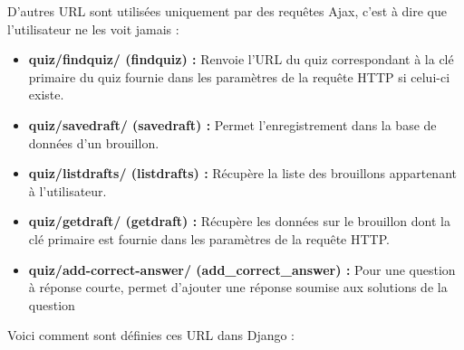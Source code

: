 \documentclass[a4,10pt,french]{sphinxmanual}
\begin{document}
D'autres URL sont utilisées uniquement par des requêtes Ajax, c'est à dire que l'utilisateur ne les voit jamais :
\begin{itemize}
\item {} 
\textbf{quiz/findquiz/ (findquiz) :} Renvoie l'URL du quiz correspondant à la clé primaire du quiz fournie dans les paramètres de la requête HTTP si celui-ci existe.

\item {} 
\textbf{quiz/savedraft/ (savedraft) :} Permet l'enregistrement dans la base de données d'un brouillon.

\item {} 
\textbf{quiz/listdrafts/ (listdrafts) :} Récupère la liste des brouillons appartenant à l'utilisateur.

\item {} 
\textbf{quiz/getdraft/ (getdraft) :} Récupère les données sur le brouillon dont la clé primaire est fournie dans les paramètres de la requête HTTP.

\item {} 
\textbf{quiz/add-correct-answer/ (add\_correct\_answer) :} Pour une question à réponse courte, permet d'ajouter une réponse soumise aux solutions de la question

\end{itemize}

Voici comment sont définies ces URL dans Django :
\end{document}
